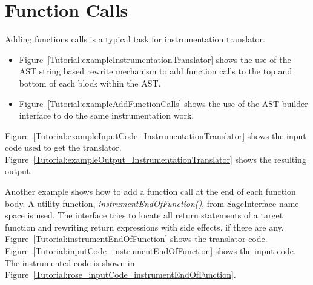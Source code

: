 \section{Function Calls}
Adding functions calls is a typical task for instrumentation translator. 
\begin{itemize}
\item Figure~\ref{Tutorial:exampleInstrumentationTranslator} shows the use of
the AST string based rewrite mechanism to add function calls to the top and bottom of 
each block within the AST.

\item Figure~\ref{Tutorial:exampleAddFunctionCalls} shows the use of
the AST builder interface to do the same instrumentation work.
\end{itemize}
   Figure~\ref{Tutorial:exampleInputCode_InstrumentationTranslator} shows the
input code used to get the translator.
Figure~\ref{Tutorial:exampleOutput_InstrumentationTranslator} shows the resulting output.

Another example shows how to add a function call at the end of each
function body. A utility function, \textit{instrumentEndOfFunction()}, from SageInterface name space is used. 
The interface tries to locate all return statements of a target function 
 and rewriting return expressions with side effects, if there are any. 
 Figure~\ref{Tutorial:instrumentEndOfFunction} shows the translator code. 
 Figure~\ref{Tutorial:inputCode_instrumentEndOfFunction} shows the input
 code. The instrumented code is shown in
 Figure~\ref{Tutorial:rose_inputCode_instrumentEndOfFunction}.

